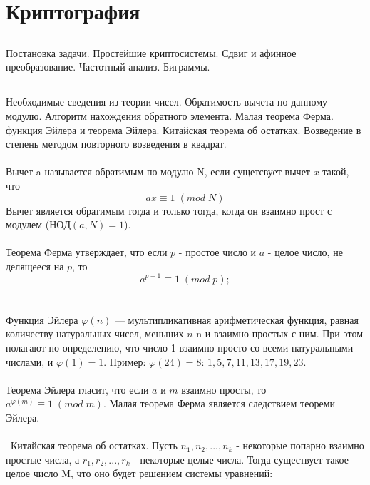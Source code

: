 \documentclass[a4paper,10pt]{article} %
\begin{document}
	\section{Криптография}
	\subsection{}
	Постановка задачи. Простейшие криптосистемы. Сдвиг и афинное преобразование.
	Частотный анализ. Биграммы.
	
	\subsection{}
	
	\subsection{}
	Необходимые сведения из теории чисел. Обратимость вычета по данному модулю.
	Алгоритм нахождения обратного элемента. Малая теорема Ферма. функция Эйлера 
	и теорема Эйлера. Китайская теорема об остатках. Возведение в степень методом
	повторного возведения в квадрат.  
	\\\\
	Вычет a называется обратимым по модулю N, если сущетсвует вычет $x$ такой, 
	что 
	\begin{equation}
		ax \equiv 1 \; (mod \; N) 
	\end{equation}
	Вычет является обратимым тогда и только тогда, когда он взаимно прост с модулем
	($НОД(a, N) = 1$).
	\\\\
	Теорема Ферма утверждает, что если $p$ - простое число и $a$ - целое число, 
	не делящееся на $p$, то
	\begin{equation}
		a^{p-1} \equiv 1 \; (mod \; p);
	\end{equation}
	\\\\
	Функция Эйлера $\varphi(n)$ — мультипликативная арифметическая функция, равная количеству натуральных чисел, меньших $n$ n и взаимно простых с ним. При этом полагают по определению, что число 1 взаимно просто со всеми натуральными числами, и $\varphi(1) = 1$. Пример: $\varphi(24) = 8$: $1, 5, 7, 11, 13, 17, 19, 23$.
	\\\\
	Теорема Эйлера гласит, что если $a$ и $m$ взаимно просты, то $a^{\varphi(m)} 
	\equiv 1 \; (mod \; m)$. Малая теорема Ферма является следствием теореми Эйлера.
	\\\\\
	Китайская теорема об остатках. Пусть $n_{1}, n_{2}, ..., n_{k}$ - некоторые попарно взаимно простые числа, а $r_{1}, r_{2}, ..., r_{k}$ - некоторые целые 
	числа. Тогда существует такое целое число M, что оно будет решением системы 
	уравнений:
	
\end{document}
